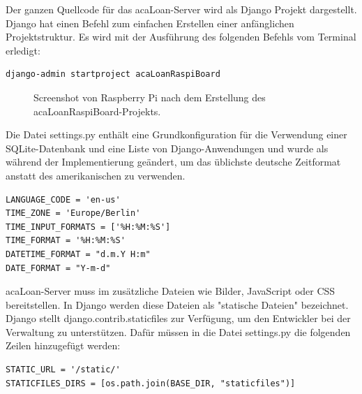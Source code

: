 Der ganzen Quellcode für das acaLoan-Server wird als Django Projekt dargestellt. Django hat einen Befehl zum einfachen Erstellen einer anfänglichen Projektstruktur. Es wird mit der Ausführung des folgenden Befehls vom Terminal erledigt:
\begin{lstlisting}[caption={[Erstellung acaLoan Django-Projekts] },captionpos=b]
 django-admin startproject acaLoanRaspiBoard   
\end{lstlisting}

\begin{figure}
	\centering
	\caption{Screenshot von Raspberry Pi nach dem Erstellung des acaLoanRaspiBoard-Projekts.}
	\label{fig:django_start}
\end{figure}

Die Datei settings.py enthält eine Grundkonfiguration für die Verwendung einer SQLite-Datenbank und eine Liste von Django-Anwendungen und wurde als während der Implementierung geändert, um das üblichste deutsche Zeitformat anstatt des amerikanischen zu verwenden.
\begin{lstlisting}[caption={Deutsches Zeitformat in Django},captionpos=b]
LANGUAGE_CODE = 'en-us'
TIME_ZONE = 'Europe/Berlin'
TIME_INPUT_FORMATS = ['%H:%M:%S']
TIME_FORMAT = '%H:%M:%S'
DATETIME_FORMAT = "d.m.Y H:m"
DATE_FORMAT = "Y-m-d"
\end{lstlisting}
acaLoan-Server muss im zusätzliche Dateien wie Bilder, JavaScript oder CSS bereitstellen. In Django werden diese Dateien als "statische Dateien" bezeichnet. Django stellt django.contrib.staticfiles zur Verfügung, um den Entwickler bei der Verwaltung zu unterstützen. Dafür müssen in die Datei settings.py die folgenden Zeilen hinzugefügt werden:
\begin{lstlisting}[caption={[Die zusätzliche Dateien in das Projekt hinzufügen] },captionpos=b]
STATIC_URL = '/static/'
STATICFILES_DIRS = [os.path.join(BASE_DIR, "staticfiles")]
\end{lstlisting}

